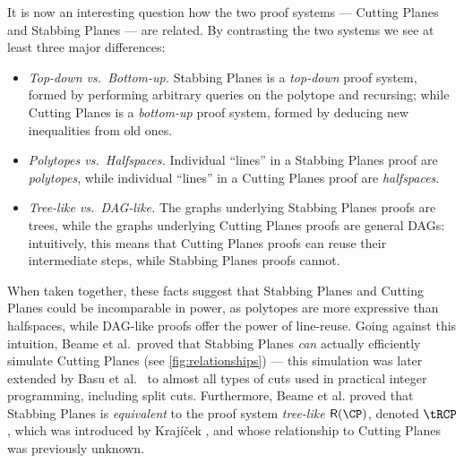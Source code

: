 \documentclass[11pt]{article}
\begin{document}
It is now an interesting question how the two proof systems --- Cutting Planes and Stabbing Planes --- are related.
By contrasting the two systems we see at least three major differences:
\begin{itemize}
\item \emph{Top-down vs.~Bottom-up.} Stabbing Planes is a \emph{top-down} proof system, formed by performing arbitrary queries on the polytope and recursing; while Cutting Planes is a \emph{bottom-up} proof system, formed by deducing new inequalities from old ones.  
%
%
%
%
%
%
%
	\item \emph{Polytopes vs.~Halfspaces.} Individual ``lines'' in a Stabbing Planes proof are \emph{polytopes}, while individual ``lines'' in a Cutting Planes proof are \emph{halfspaces}.  
	\item \emph{Tree-like vs.~DAG-like.} The graphs underlying Stabbing Planes proofs are trees, while the graphs underlying Cutting Planes proofs are general DAGs: intuitively, this means that Cutting Planes proofs can %
reuse  %
their intermediate steps, while Stabbing Planes proofs cannot.
\end{itemize}
When taken together, these facts suggest that Stabbing Planes and Cutting Planes could be incomparable in power, as polytopes are more expressive than halfspaces, while DAG-like proofs offer the power of line-reuse.
Going against this intuition, Beame et al.~proved that Stabbing Planes \emph{can} actually efficiently simulate Cutting Planes \cite{BeameFIKPPR18} (see \autoref{fig:relationships}) --- this simulation was later extended by Basu et al.~\cite{BasuCDJ21} to almost all types of cuts used in practical integer programming, including split cuts.
Furthermore, Beame et al. proved that Stabbing Planes is \emph{equivalent} to the proof system \emph{tree-like $\mathsf{R}(\CP)$}, denoted $\tRCP$, which was introduced by Kraj\'{i}\v{c}ek \cite{Krajicek98}, and whose relationship to Cutting Planes was previously unknown.
\end{document}

